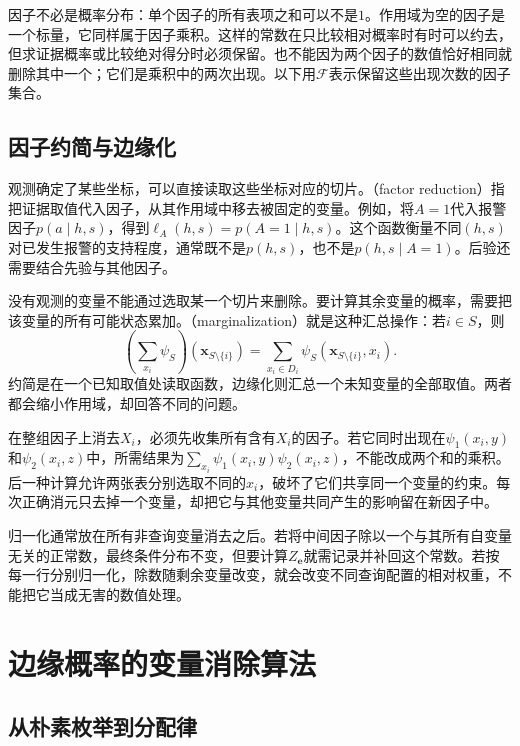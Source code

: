 因子不必是概率分布：单个因子的所有表项之和可以不是$1$。作用域为空的因子是一个标量，它同样属于因子乘积。这样的常数在只比较相对概率时有时可以约去，但求证据概率或比较绝对得分时必须保留。也不能因为两个因子的数值恰好相同就删除其中一个；它们是乘积中的两次出现。以下用$\mathcal{F}$表示保留这些出现次数的因子集合。

\subsection{因子约简与边缘化}
\label{sec:pgm-elimination-reduction-marginalization}

观测确定了某些坐标，可以直接读取这些坐标对应的切片。（factor reduction）指把证据取值代入因子，从其作用域中移去被固定的变量。例如，将$A=1$代入报警因子$p(a\mid h,s)$，得到$\ell_A(h,s)=p(A=1\mid h,s)$。这个函数衡量不同$(h,s)$对已发生报警的支持程度，通常既不是$p(h,s)$，也不是$p(h,s\mid A=1)$。后验还需要结合先验与其他因子。

没有观测的变量不能通过选取某一个切片来删除。要计算其余变量的概率，需要把该变量的所有可能状态累加。（marginalization）就是这种汇总操作：若$i\in S$，则
\begin{equation}
  (\mathop{\textstyle\sum}_{x_i}\psi_S)
    (\bm{x}_{S\setminus\{i\}})
  =\sum_{x_i\in D_i}\psi_S(\bm{x}_{S\setminus\{i\}},x_i).
  \label{eq:pgm-elimination-factor-marginal}
\end{equation}
约简是在一个已知取值处读取函数，边缘化则汇总一个未知变量的全部取值。两者都会缩小作用域，却回答不同的问题。

在整组因子上消去$X_i$，必须先收集所有含有$X_i$的因子。若它同时出现在$\psi_1(x_i,y)$和$\psi_2(x_i,z)$中，所需结果为$\sum_{x_i}\psi_1(x_i,y)\psi_2(x_i,z)$，不能改成两个和的乘积。后一种计算允许两张表分别选取不同的$x_i$，破坏了它们共享同一个变量的约束。每次正确消元只去掉一个变量，却把它与其他变量共同产生的影响留在新因子中。

归一化通常放在所有非查询变量消去之后。若将中间因子除以一个与其所有自变量无关的正常数，最终条件分布不变，但要计算$Z_{\bm{e}}$就需记录并补回这个常数。若按每一行分别归一化，除数随剩余变量改变，就会改变不同查询配置的相对权重，不能把它当成无害的数值处理。

\section{边缘概率的变量消除算法}
\label{sec:pgm-elimination-sum-product}

\subsection{从朴素枚举到分配律}
\label{sec:pgm-elimination-distributivity}

